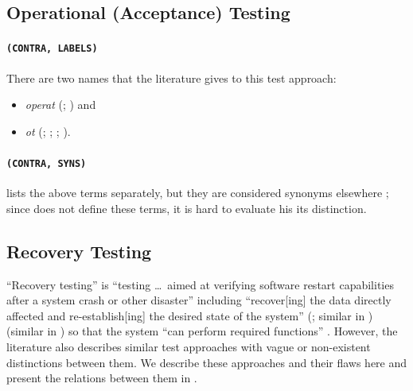 \ifnotpaper
    \subsection{Operational (Acceptance) Testing}\label{oat-flaw}
    \paragraph{\texttt{(CONTRA, LABELS)}}
    There are two names that the literature gives to this test approach:
    \begin{itemize}
        \item \emph{\acf{operat}} (\citealp[p.~22]{IEEE2022};
              \citealpISTQB{}) and
        \item \emph{\acf{ot}} (\citealp{ISO_IEC2018};
              \citealp[p.~303]{IEEE2017}; \citealp[p.~6\=/9, in the context of
                  software engineering operations]{SWEBOK2024};
              \citealp[pp.~4\=/6, 4\=/9]{SWEBOK2014}).
    \end{itemize}

    \paragraph{\texttt{(CONTRA, SYNS)}}
     \citet[p.~30]{Firesmith2015} lists the above terms separately,
    but they are considered synonyms elsewhere \citep{LambdaTest2024,
        BocchinoAndHamilton1996}; since
    \citeauthor{Firesmith2015} does not define these terms, it is hard to
    evaluate \ifnotpaper his \else its \fi distinction.
\fi

\subsection{Recovery Testing}\label{recov-flaw}

``Recovery testing'' is ``testing \dots\ aimed at verifying
software restart capabilities after a system crash or other disaster''
\citep[p.~5\=/9]{SWEBOK2024} including ``recover[ing] the data directly affected
and re-establish[ing] the desired state of the system'' \ifnotpaper
    (\citealp{ISO_IEC2023a}; similar in \citealp[p.~7\=/10]{SWEBOK2024})
\else \cite{ISO_IEC2023a} (similar in \cite[p.~7\=/10]{SWEBOK2024}) \fi
so that the system ``can perform required functions'' \citep[p.~370]{IEEE2017}.
However, the literature also describes similar test approaches with vague or
non-existent distinctions between them. We describe these approaches and their
flaws here and present the relations between them in .

